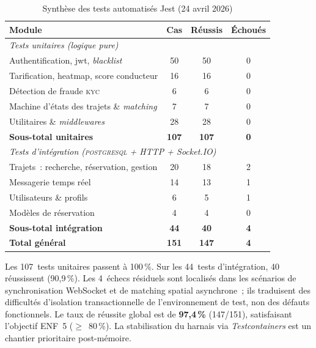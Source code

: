 \begin{table}[H]
\centering
\footnotesize
\begin{tabularx}{\textwidth}{|X|c|c|c|}
\hline
\rowcolor{rohlight}
\textbf{Module} & \textbf{Cas} & \textbf{Réussis} & \textbf{Échoués} \\
\hline
\multicolumn{4}{|l|}{\cellcolor{rohlight!40}\textit{Tests unitaires (logique pure)}} \\
\hline
Authentification, \gls{jwt}, \textit{blacklist} & 50 & 50 & 0 \\
\hline
Tarification, heatmap, score conducteur & 16 & 16 & 0 \\
\hline
Détection de fraude \textsc{kyc} & 6 & 6 & 0 \\
\hline
Machine d'états des trajets \& \textit{matching} & 7 & 7 & 0 \\
\hline
Utilitaires \& \textit{middlewares} & 28 & 28 & 0 \\
\hline
\rowcolor{rohlight!20}
\textbf{Sous-total unitaires} & \textbf{107} & \textbf{107} & \textbf{0} \\
\hline
\multicolumn{4}{|l|}{\cellcolor{rohlight!40}\textit{Tests d'intégration (\textsc{postgresql} + HTTP + Socket.IO)}} \\
\hline
Trajets~: recherche, réservation, gestion & 20 & 18 & 2 \\
\hline
Messagerie temps réel & 14 & 13 & 1 \\
\hline
Utilisateurs \& profils & 6 & 5 & 1 \\
\hline
Modèles de réservation & 4 & 4 & 0 \\
\hline
\rowcolor{rohlight!20}
\textbf{Sous-total intégration} & \textbf{44} & \textbf{40} & \textbf{4} \\
\hline
\rowcolor{rohlight}
\textbf{Total général} & \textbf{151} & \textbf{147} & \textbf{4} \\
\hline
\end{tabularx}
  \caption{Synthèse des tests automatisés Jest (24 avril 2026)}
  \label{tab:tests}
\end{table}

Les 107~tests unitaires passent à 100\,\%. Sur les 44~tests d'intégration, 40 réussissent (90,9\,\%). Les 4~échecs résiduels sont localisés dans les scénarios de synchronisation WebSocket et de matching spatial asynchrone~; ils traduisent des difficultés d'isolation transactionnelle de l'environnement de test, non des défauts fonctionnels. Le taux de réussite global est de \textbf{97,4\,\%} (147/151), satisfaisant l'objectif ENF~5 ($\geq$~80\,\%). La stabilisation du harnais via \textit{Testcontainers} est un chantier prioritaire post-mémoire.

